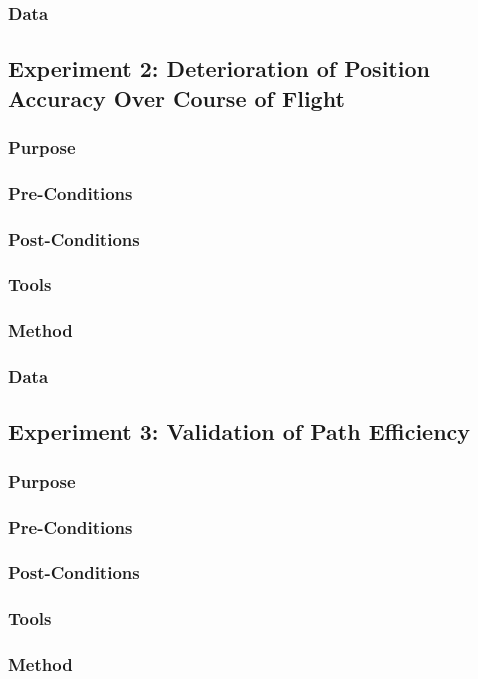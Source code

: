\documentclass[letterpaper,10pt]{article}
\begin{document}
\subsubsection{Data}

\subsection{Experiment 2: Deterioration of Position Accuracy Over Course of Flight}
\subsubsection{Purpose}
\subsubsection{Pre-Conditions}
\subsubsection{Post-Conditions}
\subsubsection{Tools}
\subsubsection{Method}
\subsubsection{Data}

\subsection{Experiment 3: Validation of Path Efficiency}
\subsubsection{Purpose}
\subsubsection{Pre-Conditions}
\subsubsection{Post-Conditions}
\subsubsection{Tools}
\subsubsection{Method}
\end{document}
